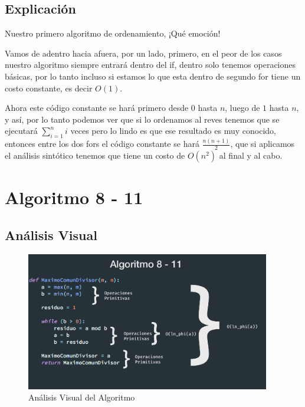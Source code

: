 \documentclass[12pt, fleqn]{article}                            %
\theoremstyle{break}                                            %
\begin{document}
    \vspace{1em}
    \subsection{Explicación}

        Nuestro primero algoritmo de ordenamiento, ¡Qué emoción!

        Vamos de adentro hacia afuera, por un lado, primero, en el peor de los casos
        nuestro algoritmo siempre entrará dentro del if, dentro solo tenemos operaciones
        básicas, por lo tanto incluso si estamos lo que esta dentro de segundo for tiene un costo
        constante, es decir $O(1)$.

        Ahora este código constante se hará primero desde $0$ hasta $n$, luego de $1$ hasta $n$, y 
        así, por lo tanto podemos ver que si lo ordenamos al reves tenemos que se ejecutará $\sum_{i=1}^n i$
        veces pero lo lindo es que ese resultado es muy conocido, entonces entre los dos fors el código
        constante se hará $\frac{n(n+1)}{2}$, que si aplicamos el análisis sintótico tenemos que tiene
        un costo de $O(n^2)$ al final y al cabo.



\clearpage
\section{Algoritmo 8 - 11}


    \subsection{Análisis Visual}

        \begin{figure}[h]
            \centering
            \includegraphics[width=0.95\textwidth]{Algoritmo8}
            \caption{Análisis Visual del Algoritmo}
        \end{figure}
\end{document}
